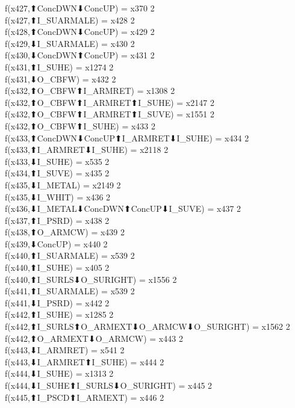 f(x427,⬆ConcDWN⬇ConcUP) = x370 {2} \\
f(x427,⬆I_SUARMALE) = x428 {2} \\
f(x428,⬆ConcDWN⬇ConcUP) = x429 {2} \\
f(x429,⬇I_SUARMALE) = x430 {2} \\
f(x430,⬇ConcDWN⬆ConcUP) = x431 {2} \\
f(x431,⬆I_SUHE) = x1274 {2} \\
f(x431,⬇O_CBFW) = x432 {2} \\
f(x432,⬆O_CBFW⬆I_ARMRET) = x1308 {2} \\
f(x432,⬆O_CBFW⬆I_ARMRET⬆I_SUHE) = x2147 {2} \\
f(x432,⬆O_CBFW⬆I_ARMRET⬆I_SUVE) = x1551 {2} \\
f(x432,⬆O_CBFW⬆I_SUHE) = x433 {2} \\
f(x433,⬆ConcDWN⬇ConcUP⬆I_ARMRET⬇I_SUHE) = x434 {2} \\
f(x433,⬆I_ARMRET⬇I_SUHE) = x2118 {2} \\
f(x433,⬇I_SUHE) = x535 {2} \\
f(x434,⬆I_SUVE) = x435 {2} \\
f(x435,⬇I_METAL) = x2149 {2} \\
f(x435,⬇I_WHIT) = x436 {2} \\
f(x436,⬇I_METAL⬇ConcDWN⬆ConcUP⬇I_SUVE) = x437 {2} \\
f(x437,⬆I_PSRD) = x438 {2} \\
f(x438,⬆O_ARMCW) = x439 {2} \\
f(x439,⬇ConcUP) = x440 {2} \\
f(x440,⬆I_SUARMALE) = x539 {2} \\
f(x440,⬆I_SUHE) = x405 {2} \\
f(x440,⬆I_SURLS⬇O_SURIGHT) = x1556 {2} \\
f(x441,⬆I_SUARMALE) = x539 {2} \\
f(x441,⬇I_PSRD) = x442 {2} \\
f(x442,⬆I_SUHE) = x1285 {2} \\
f(x442,⬆I_SURLS⬆O_ARMEXT⬇O_ARMCW⬇O_SURIGHT) = x1562 {2} \\
f(x442,⬆O_ARMEXT⬇O_ARMCW) = x443 {2} \\
f(x443,⬇I_ARMRET) = x541 {2} \\
f(x443,⬇I_ARMRET⬆I_SUHE) = x444 {2} \\
f(x444,⬇I_SUHE) = x1313 {2} \\
f(x444,⬇I_SUHE⬆I_SURLS⬇O_SURIGHT) = x445 {2} \\
f(x445,⬆I_PSCD⬆I_ARMEXT) = x446 {2} \\
